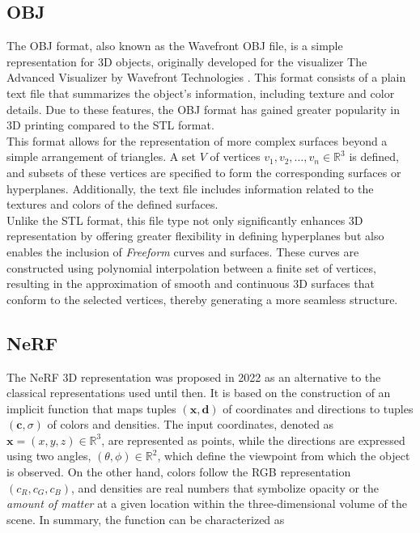 \documentclass[journal]{IEEEtran}
\begin{document}
\subsection{OBJ}
The OBJ format, also known as the Wavefront OBJ file, is a simple representation for 3D objects, originally developed for the visualizer The Advanced Visualizer by Wavefront Technologies \cite{Wavefront}. This format consists of a plain text file that summarizes the object's information, including texture and color details. Due to these features, the OBJ format has gained greater popularity in 3D printing compared to the STL format.\\

This format allows for the representation of more complex surfaces beyond a simple arrangement of triangles. A set $V$ of vertices $v_1, v_2, \dots, v_n \in \mathbb{R}^3$ is defined, and subsets of these vertices are specified to form the corresponding surfaces or hyperplanes. Additionally, the text file includes information related to the textures and colors of the defined surfaces.
\\

Unlike the STL format, this file type not only significantly enhances 3D representation by offering greater flexibility in defining hyperplanes but also enables the inclusion of \textit{Freeform} curves and surfaces. These curves are constructed using polynomial interpolation between a finite set of vertices, resulting in the approximation of smooth and continuous 3D surfaces that conform to the selected vertices, thereby generating a more seamless structure.



\subsection{NeRF}
\label{subsec:nerf}
The NeRF 3D representation was proposed in 2022 \cite{NeRF} as an alternative to the classical representations used until then. It is based on the construction of an implicit function that maps tuples $(\mathbf{x}, \mathbf{d})$ of coordinates and directions to tuples $(\mathbf{c}, \sigma)$ of colors and densities. The input coordinates, denoted as $\mathbf{x} = (x, y, z) \in \mathbb{R}^3$, are represented as points, while the directions are expressed using two angles, $(\theta, \phi) \in \mathbb{R}^2$, which define the viewpoint from which the object is observed. On the other hand, colors follow the RGB representation $(c_R, c_G, c_B)$, and densities are real numbers that symbolize opacity or the \textit{amount of matter} at a given location within the three-dimensional volume of the scene. In summary, the function can be characterized as  
\end{document}
